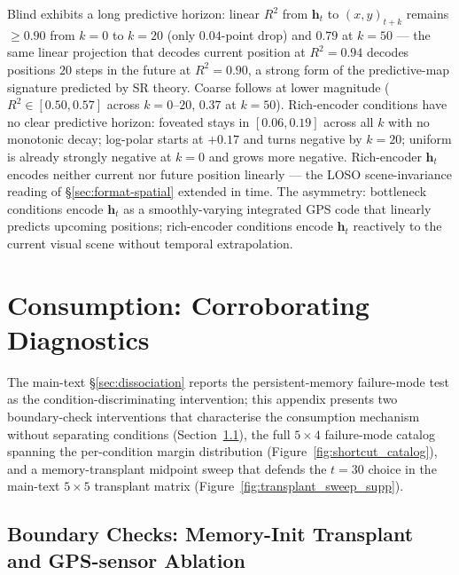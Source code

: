 \documentclass{article}
\begin{document}
Blind exhibits a long predictive horizon: linear $R^2$ from $\mathbf{h}_t$ to $(x, y)_{t+k}$ remains $\geq 0.90$ from $k=0$ to $k=20$ (only $0.04$-point drop) and $0.79$ at $k=50$ --- the same linear projection that decodes current position at $R^2 = 0.94$ decodes positions $20$ steps in the future at $R^2 = 0.90$, a strong form of the predictive-map signature predicted by SR theory. Coarse follows at lower magnitude ($R^2 \in [0.50, 0.57]$ across $k=0$--$20$, $0.37$ at $k=50$). Rich-encoder conditions have no clear predictive horizon: foveated stays in $[0.06, 0.19]$ across all $k$ with no monotonic decay; log-polar starts at $+0.17$ and turns negative by $k=20$; uniform is already strongly negative at $k=0$ and grows more negative. Rich-encoder $\mathbf{h}_t$ encodes neither current nor future position linearly --- the LOSO scene-invariance reading of §\ref{sec:format-spatial} extended in time. The asymmetry: bottleneck conditions encode $\mathbf{h}_t$ as a smoothly-varying integrated GPS code that linearly predicts upcoming positions; rich-encoder conditions encode $\mathbf{h}_t$ reactively to the current visual scene without temporal extrapolation.


\section{Consumption: Corroborating Diagnostics}
\label{app:consumption-detail}
\label{app:causal-detail}

The main-text §\ref{sec:dissociation} reports the persistent-memory failure-mode test as the condition-discriminating intervention; this appendix presents two boundary-check interventions that characterise the consumption mechanism without separating conditions (Section~\ref{app:boundary-checks}), the full $5{\times}4$ failure-mode catalog spanning the per-condition margin distribution (Figure~\ref{fig:shortcut_catalog}), and a memory-transplant midpoint sweep that defends the $t{=}30$ choice in the main-text $5{\times}5$ transplant matrix (Figure~\ref{fig:transplant_sweep_supp}).

\subsection{Boundary Checks: Memory-Init Transplant and GPS-sensor Ablation}
\label{app:boundary-checks}
\end{document}
